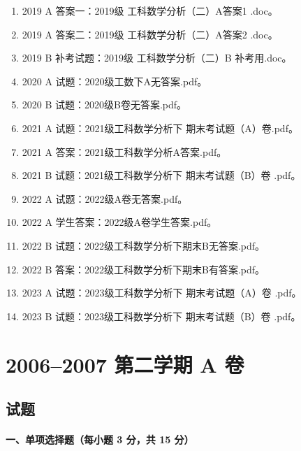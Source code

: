 \begin{enumerate}
  \item 2019 A 答案一：2019级 工科数学分析（二）A答案1 .doc。
  \item 2019 A 答案二：2019级 工科数学分析（二）A答案2 .doc。
  \item 2019 B 补考试题：2019级 工科数学分析（二）B 补考用.doc。
  \item 2020 A 试题：2020级工数下A无答案.pdf。
  \item 2020 B 试题：2020级B卷无答案.pdf。
  \item 2021 A 试题：2021级工科数学分析下 期末考试题（A）卷.pdf。
  \item 2021 A 答案：2021级工科数学分析A答案.pdf。
  \item 2021 B 试题：2021级工科数学分析下 期末考试题（B）卷 .pdf。
  \item 2022 A 试题：2022级A卷无答案.pdf。
  \item 2022 A 学生答案：2022级A卷学生答案.pdf。
  \item 2022 B 试题：2022级工科数学分析下期末B无答案.pdf。
  \item 2022 B 答案：2022级工科数学分析下期末B有答案.pdf。
  \item 2023 A 试题：2023级工科数学分析下 期末考试题（A）卷 .pdf。
  \item 2023 B 试题：2023级工科数学分析下 期末考试题（B）卷 .pdf。
\end{enumerate}


\section{2006--2007 第二学期 A 卷}

\subsection{试题}

\paragraph*{一、单项选择题（每小题 3 分，共 15 分）}

